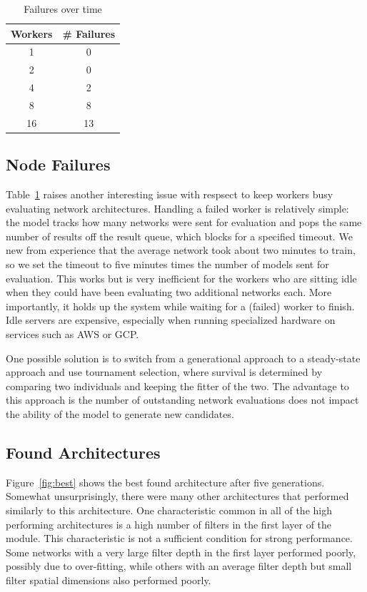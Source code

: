 \documentclass[conference]{IEEEtran}
\begin{document}
\begin{table}
  \centering
  \caption{Failures over time}
  \label{tab:failures}
  \begin{tabular}{cc}\toprule
    \textbf{Workers} & \textbf{\# Failures}\\\midrule
    1 & 0\\
    2 & 0\\
    4 & 2\\
    8 & 8\\
    16 & 13\\\bottomrule
  \end{tabular}
\end{table}
\subsection{Node Failures}
Table~\ref{tab:failures} raises another interesting issue with respsect
to keep workers busy evaluating network architectures. Handling a failed
worker is relatively simple: the model tracks how many networks were
sent for evaluation and pops the same number of results off the result
queue, which blocks for a specified timeout. We new from experience that the
average network took about two minutes to train, so we set the timeout to
five minutes times the number of models sent for evaluation. This works
but is very inefficient for the workers who are sitting idle when
they could have been evaluating two additional networks each. More importantly,
it holds up the system while waiting for a (failed) worker to finish.
Idle servers
are expensive, especially when running specialized hardware on services
such as AWS or GCP.

One possible solution is to switch from a generational approach to a steady-state
approach and use tournament selection, where survival is determined by comparing
two individuals and keeping the fitter of the two. The advantage to this approach
is the number of outstanding network evaluations does not impact the ability of
the model to generate new candidates.

\subsection{Found Architectures}
Figure~\ref{fig:best} shows the best found architecture after five generations.
Somewhat unsurprisingly, there were many other architectures that performed
similarly to this architecture. One characteristic common in all of the high
performing architectures is a high number of filters in the first layer of
the module. This characteristic is not a sufficient condition for strong
performance. Some networks with a very large filter depth in the first layer
performed poorly, possibly due to over-fitting, while others with an average
filter depth but small filter spatial dimensions also performed poorly.
\end{document}

